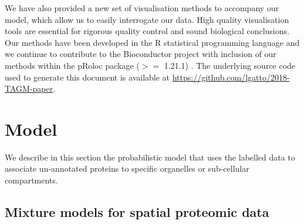 \documentclass[12pt,english]{article}\usepackage[]{graphicx}\usepackage[]{color}
\begin{document}
We have also provided a new set of visualisation methods to accompany
our model, which allow us to easily interrogate our data. High quality
visualisation tools are essential for rigorous quality control and
sound biological conclusions.  Our methods have been developed in the
R statistical programming language and we continue to contribute to
the Bioconductor project \citep{Bioconductor::2004, Huber::2015} with
inclusion of our methods within the pRoloc package ($>=$ 1.21.1)
\citep{pRoloc:2014}. The underlying source code used to generate this
document is available at
\url{https://github.com/lgatto/2018-TAGM-paper}.

\bigskip


{\color{black}{Currently, our model does not integrate localisation information
from different data sources, nor does it explicitly model proteins with multiple
localisation. However, one (of many) biological explanations for the uncertainty
that we model in the allocation probabilities is provided by multiple localisation.
Thus a protein for which it is uncertain to which two sub-cellular niches it is
resident within it is perhaps resident of both niches. In further work, we plan
to explicitly model such cases to deconvolute different sources of uncertainty.
In addition, extensions to semi-supervised non-parametric methods are under
consideration to detect novel sub-cellular niches. These are the subjects of further work.
}}


\bigskip

\section*{Model}\label{section:methods}

We describe in this section the probabilistic model that uses the
labelled data to associate un-annotated proteins to specific
organelles or sub-cellular compartments.

\subsection*{Mixture models for spatial proteomic data}
\end{document}
